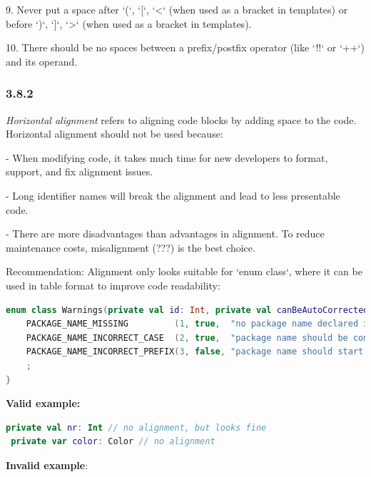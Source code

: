 {{{{9. Never put a space after `(`, `[`, `<` (when used as a bracket in templates) or before `)`, `]`, `>` (when used as a bracket in templates).



10. There should be no spaces between a prefix/postfix operator (like `!!` or `++`) and its operand.



\subsubsection*{\textbf{3.8.2}}
\leavevmode\newline



\textit{Horizontal alignment} refers to aligning code blocks by adding space to the code. Horizontal alignment should not be used because:



- When modifying code, it takes much time for new developers to format, support, and fix alignment issues.

- Long identifier names will break the alignment and lead to less presentable code.

- There are more disadvantages than advantages in alignment. To reduce maintenance costs, misalignment (???) is the best choice.



Recommendation: Alignment only looks suitable for `enum class`, where it can be used in table format to improve code readability:

\begin{lstlisting}[language=Kotlin]
enum class Warnings(private val id: Int, private val canBeAutoCorrected: Boolean, private val warn: String) : Rule {
    PACKAGE_NAME_MISSING         (1, true,  "no package name declared in a file"),
    PACKAGE_NAME_INCORRECT_CASE  (2, true,  "package name should be completely in a lower case"),
    PACKAGE_NAME_INCORRECT_PREFIX(3, false, "package name should start from the company's domain")
    ;
}
\end{lstlisting}


\textbf{Valid example:}

\begin{lstlisting}[language=Kotlin]
 private val nr: Int // no alignment, but looks fine
 private var color: Color // no alignment
\end{lstlisting}


\textbf{Invalid example}:

}}}}
